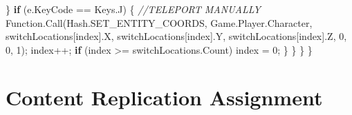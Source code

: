 \documentclass[
  openany]{book}
\newenvironment{Shaded}{\begin{snugshade}}{\end{snugshade}}
\newcommand{\CommentTok}[1]{\textcolor[rgb]{0.56,0.35,0.01}{\textit{#1}}}
\newcommand{\DecValTok}[1]{\textcolor[rgb]{0.00,0.00,0.81}{#1}}
\newcommand{\FunctionTok}[1]{\textcolor[rgb]{0.00,0.00,0.00}{#1}}
\newcommand{\KeywordTok}[1]{\textcolor[rgb]{0.13,0.29,0.53}{\textbf{#1}}}
\newcommand{\NormalTok}[1]{#1}
\begin{document}
\begin{Shaded}
\begin{Highlighting}[]
\NormalTok{           \}}
           \KeywordTok{if}\NormalTok{ (e.}\FunctionTok{KeyCode}\NormalTok{ == Keys.}\FunctionTok{J}\NormalTok{)}
\NormalTok{           \{}
              \CommentTok{//TELEPORT MANUALLY}
\NormalTok{              Function.}\FunctionTok{Call}\NormalTok{(Hash.}\FunctionTok{SET_ENTITY_COORDS}\NormalTok{, Game.}\FunctionTok{Player}\NormalTok{.}\FunctionTok{Character}\NormalTok{, switchLocations[index].}\FunctionTok{X}\NormalTok{, switchLocations[index].}\FunctionTok{Y}\NormalTok{, switchLocations[index].}\FunctionTok{Z}\NormalTok{, }\DecValTok{0}\NormalTok{, }\DecValTok{0}\NormalTok{, }\DecValTok{1}\NormalTok{);}
\NormalTok{              index++;}
              \KeywordTok{if}\NormalTok{ (index >= switchLocations.}\FunctionTok{Count}\NormalTok{) index = }\DecValTok{0}\NormalTok{;}
\NormalTok{            \}}
\NormalTok{        \}}
\NormalTok{    \}}
\NormalTok{\}}


\end{Highlighting}
\end{Shaded}

\hypertarget{content-replication-assignment-7}{%
\section*{Content Replication Assignment}\label{content-replication-assignment-7}}
\end{document}
